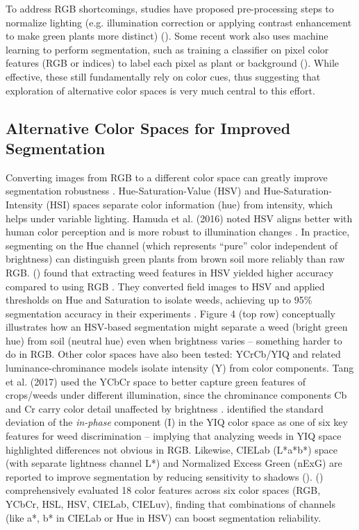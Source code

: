 \documentclass[letterpaper, notitlepage]{report}
\begin{document}
%
To address RGB shortcomings, studies have proposed pre-processing steps to normalize lighting (e.g. illumination correction or applying contrast enhancement to make green plants more distinct) (\cite{Lu2022-rq}). Some recent work also uses machine learning to perform segmentation, such as training a classifier on pixel color features (RGB or indices) to label each pixel as plant or background (\cite{Gee2020-cz}). While effective, these still fundamentally rely on color cues, thus suggesting that exploration of alternative color spaces is very much central to this effort.
%
\subsection{Alternative Color Spaces  for Improved Segmentation}  
Converting images from RGB to a different color space can greatly improve segmentation robustness \parencite{Khattab2014-eu}. Hue-Saturation-Value (HSV) and Hue-Saturation-Intensity (HSI) spaces separate color information (hue) from intensity, which helps under variable lighting. Hamuda et al. (2016) noted HSV aligns better with human color perception and is more robust to illumination changes \parencite{Hamuda2017-nf}. In practice, segmenting on the Hue channel (which represents “pure” color independent of brightness) can distinguish green plants from brown soil more reliably than raw RGB. \citeauthor{Priya2019-zw} (\citeyear{Priya2019-zw}) found that extracting weed features in HSV yielded higher accuracy compared to using RGB \parencite{Priya2019-zw}. They converted field images to HSV and applied thresholds on Hue and Saturation to isolate weeds, achieving up to 95\% segmentation accuracy in their experiments . Figure 4 (top row) conceptually illustrates how an HSV-based segmentation might separate a weed (bright green hue) from soil (neutral hue) even when brightness varies – something harder to do in RGB. 
%
Other color spaces have also been tested: YCrCb/YIQ and related luminance-chrominance models isolate intensity (Y) from color components. Tang et al. (2017) used the YCbCr space to better capture green features of crops/weeds under different illumination, since the chrominance components Cb and Cr carry color detail unaffected by brightness \parencite{Wu2021-gt}. \citeauthor{Sabzi2020-af} identified the standard deviation of the \textit{in-phase} component (I) in the YIQ color space as one of six key features for weed discrimination \parencite{Sabzi2020-af} – implying that analyzing weeds in YIQ space highlighted differences not obvious in RGB. Likewise, CIELab (L*a*b*) space (with separate lightness channel L*) and Normalized Excess Green (nExG) are reported to improve segmentation by reducing sensitivity to shadows (\parencite{Wu2021-gt}). \citeauthor{Guo2013-eq} (\citeyear{Guo2013-eq}) comprehensively evaluated 18 color features across six color spaces (RGB, YCbCr, HSL, HSV, CIELab, CIELuv), finding that combinations of channels (like a*, b* in CIELab or Hue in HSV) can boost segmentation reliability.  
\end{document}
